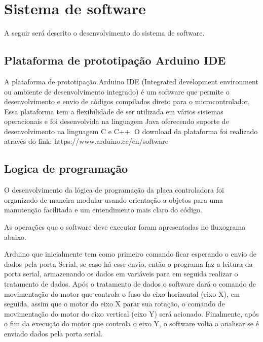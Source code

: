 \section{Sistema de software}\label{sec:metsissof}

A seguir será descrito o desenvolvimento do sistema de software.

\subsection{Plataforma de prototipação Arduino IDE}\label{subsec:metide}

A plataforma de prototipação Arduino IDE (Integrated development environment ou ambiente de desenvolvimento 
integrado) é um software que permite o desenvolvimento e envio de códigos compilados direto para o 
microcontrolador. Essa plataforma tem a flexibilidade de ser utilizada em vários sistemas operacionais 
e foi desenvolvida na linguagem Java oferecendo suporte de desenvolvimento na linguagem C e C++. 
O download da plataforma foi realizado através do link: https://www.arduino.cc/en/software

    
\subsection{Logica de programação}\label{subsec:metlogica}

O desenvolvimento da lógica de programação da placa controladora foi organizado de maneira modular 
usando orientação a objetos para uma manutenção facilitada e um entendimento mais claro do código.

As operações que o software deve executar foram apresentadas no fluxograma abaixo.

    
Arduino que inicialmente tem como primeiro comando ficar esperando o envio de dados pela porta Serial, 
se caso há esse envio, então o programa faz a leitura da porta serial, armazenando os dados em variáveis 
para em seguida realizar o tratamento de dados. Após o tratamento de dados o software dará o comando de 
movimentação do motor que controla o fuso do eixo horizontal (eixo X), em seguida, assim que o motor do 
eixo X parar sua rotação, o comando de movimentação do motor do eixo vertical (eixo Y) será acionado. 
Finalmente, após o fim da execução do motor que controla o eixo Y, o software volta a analisar se é enviado 
dados pela porta serial.

